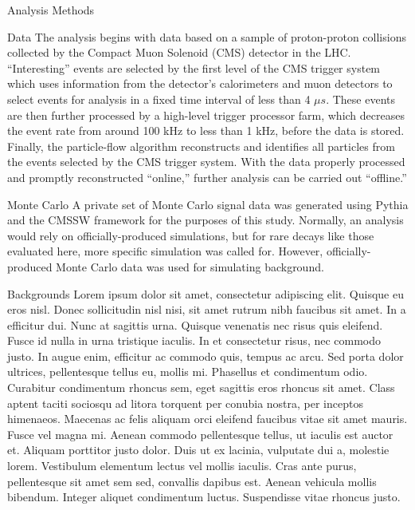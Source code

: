 \begin{section}{Analysis Methods}
\begin{subsection}{Data}
The analysis begins with data based on a sample of proton-proton collisions collected by the Compact Muon Solenoid (CMS) detector in the LHC. ``Interesting'' events are selected by the first level of the CMS trigger system which uses information from the detector's calorimeters and muon detectors to select events for analysis in a fixed time interval of less than 4 $\mu s$. These events are then further processed by a high-level trigger processor farm, which decreases the event rate from around 100 kHz to less than 1 kHz, before the data is stored. Finally, the particle-flow algorithm reconstructs and identifies all particles from the events selected by the CMS trigger system. With the data properly processed and promptly reconstructed ``online,'' further analysis can be carried out ``offline.''
\end{subsection}
\begin{subsection}{Monte Carlo}
A private set of Monte Carlo signal data was generated using Pythia and the CMSSW framework for the purposes of this study. Normally, an analysis would rely on officially-produced simulations, but for rare decays like those evaluated here, more specific simulation was called for. However, officially-produced Monte Carlo data was used for simulating background. 
\end{subsection}
\begin{subsection}{Backgrounds}
Lorem ipsum dolor sit amet, consectetur adipiscing elit. Quisque eu eros nisl. Donec sollicitudin nisl nisi, sit amet rutrum nibh faucibus sit amet. In a efficitur dui. Nunc at sagittis urna. Quisque venenatis nec risus quis eleifend. Fusce id nulla in urna tristique iaculis. In et consectetur risus, nec commodo justo. In augue enim, efficitur ac commodo quis, tempus ac arcu. Sed porta dolor ultrices, pellentesque tellus eu, mollis mi. Phasellus et condimentum odio. Curabitur condimentum rhoncus sem, eget sagittis eros rhoncus sit amet. Class aptent taciti sociosqu ad litora torquent per conubia nostra, per inceptos himenaeos. Maecenas ac felis aliquam orci eleifend faucibus vitae sit amet mauris. Fusce vel magna mi. Aenean commodo pellentesque tellus, ut iaculis est auctor et.
Aliquam porttitor justo dolor. Duis ut ex lacinia, vulputate dui a, molestie lorem. Vestibulum elementum lectus vel mollis iaculis. Cras ante purus, pellentesque sit amet sem sed, convallis dapibus est. Aenean vehicula mollis bibendum. Integer aliquet condimentum luctus. Suspendisse vitae rhoncus justo.
\end{subsection}
\end{section}

